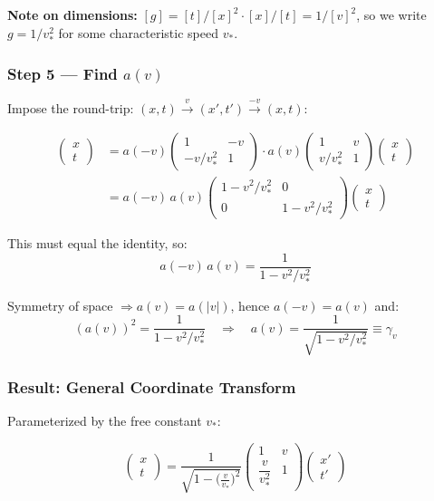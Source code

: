 \textbf{Note on dimensions:}
$[g] = [t]/[x]^2 \cdot [x]/[t] = 1/[v]^2$, so we write $g = 1/v_*^2$
for some characteristic speed $v_*$.

\subsubsection*{Step 5 --- Find $a(v)$}

Impose the round-trip: $(x,t) \xrightarrow{v} (x',t') \xrightarrow{-v} (x,t)$:

\begin{align*}
  \begin{pmatrix}x\\t\end{pmatrix}
  &= a(-v)\begin{pmatrix}1&-v\\[3pt]-v/v_*^2&1\end{pmatrix}
    \cdot
    a(v)\begin{pmatrix}1&v\\[3pt]v/v_*^2&1\end{pmatrix}
    \begin{pmatrix}x\\t\end{pmatrix} \\[6pt]
  &= a(-v)\,a(v)
    \begin{pmatrix}1-v^2/v_*^2 & 0 \\ 0 & 1-v^2/v_*^2\end{pmatrix}
    \begin{pmatrix}x\\t\end{pmatrix}
\end{align*}

This must equal the identity, so:
\[
  a(-v)\,a(v) = \frac{1}{1-v^2/v_*^2}
\]

Symmetry of space $\Rightarrow a(v) = a(|v|)$, hence $a(-v) = a(v)$ and:
\[
  (a(v))^2 = \frac{1}{1-v^2/v_*^2}
  \quad\Rightarrow\quad
  \boxed{a(v) = \frac{1}{\sqrt{1-v^2/v_*^2}} \equiv \gamma_v}
\]

\subsubsection*{Result: General Coordinate Transform}

Parameterized by the free constant $v_*$:

\begin{tcolorbox}
\[
  \begin{pmatrix}x\\t\end{pmatrix}
  = \frac{1}{\sqrt{1-\bigl(\frac{v}{v_*}\bigr)^2}}
    \begin{pmatrix}1 & v \\[6pt] \dfrac{v}{v_*^2} & 1\end{pmatrix}
  \begin{pmatrix}x'\\t'\end{pmatrix}
\]
\end{tcolorbox}

